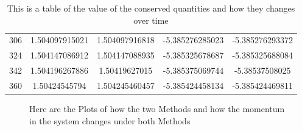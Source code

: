 \documentclass[a4paper,10pt]{article}
\begin{document}
\begin{table}[htbp]
\begin{center}
\begin{tabular}{|c|c|c|c|c|}
   306 & 1.504097915021 & 1.504097916818 & -5.385276285023 &  -5.385276293372\\
   324 & 1.504147086912 & 1.504147088935 & -5.385325678687 &  -5.385325688084\\ 
   342 & 1.504196267886 & 1.50419627015 & -5.385375069744 &  -5.38537508025\\ 
   360 & 1.50424545794 & 1.504245460457 & -5.385424458134 &  -5.385424469811\\
\hline 
\end{tabular}
\end{center}
\caption{\label{table:Magnitude of Conserved Quantities} This is a table of the value of the conserved quantities and how they changes over time}
\end{table}


\begin{figure}[]
   \centering
   \caption{Here are the Plots of how the two Methods and how the momentum in the system changes under both Methods}
   \label{plot:linear}
\end{figure}
\end{document}

